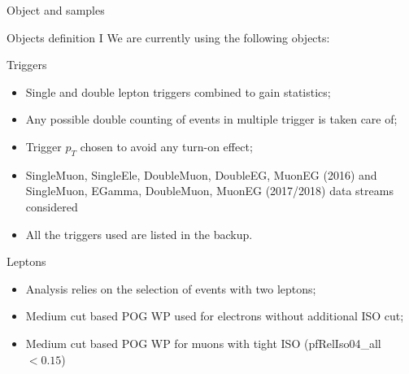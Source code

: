 \documentclass[8pt]{beamer}
\begin{document}
\begin{frame}[standout]
Object and samples
\end{frame}

\begin{frame}{Objects definition I}
\justifying
We are currently using the following objects: \vfill

\vspace{5pt} \begin{block}{\centering Triggers}\end{block} \vspace{-6pt}
\begin{itemize}
\justifying
\item \alert{Single and double lepton triggers} combined to gain statistics;
\item Any possible double counting of events in multiple trigger is taken care of;
\item Trigger $p_T$ chosen to avoid any turn-on effect;
\item SingleMuon, SingleEle, DoubleMuon, DoubleEG, MuonEG (2016) and SingleMuon, EGamma, DoubleMuon, MuonEG (2017/2018) data streams considered
\item All the triggers used are listed in the backup.
\end{itemize} \vfill

\begin{block}{\centering Leptons}\end{block} \vspace{-6pt}
\begin{itemize}
\justifying
\item Analysis relies on the selection of events with two leptons;
\item \alert{Medium cut based} POG WP used for electrons without additional ISO cut;
\item \alert{Medium cut based} POG WP for muons with tight ISO (pfRelIso04\_all $< 0.15$)
\end{itemize}
\end{frame}
\end{document}
